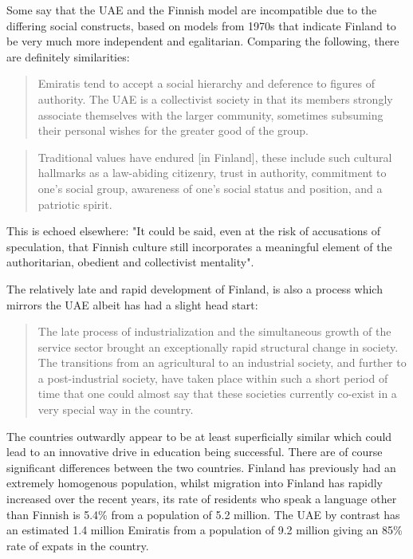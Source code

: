 Some \cite{Hatherley-Greene2016} say that the UAE and the Finnish model are incompatible due to the differing social constructs, based on models from 1970s that indicate Finland to be very much more independent and egalitarian. Comparing the following, there are definitely similarities:

\begin{quote}
Emiratis tend to accept a social hierarchy and deference to figures of authority. The UAE is a collectivist society in that its members strongly associate themselves with the larger community, sometimes subsuming their personal wishes for the greater good of the group.
\end{quote} \cite{Hatherley-Greene2016}

\begin{quote}
Traditional values have endured [in Finland], these include such cultural hallmarks as a law-abiding citizenry, trust in authority, commitment to one’s social group, awareness of one’s social status and position, and a patriotic spirit.
\end{quote} \cite{Sahlberg2007}

This is echoed elsewhere: "It could be said, even at the risk of accusations of speculation, that Finnish culture still incorporates a meaningful element of the authoritarian, obedient and collectivist mentality". \cite{Simola2005}

The relatively late and rapid development of Finland, is also a process which mirrors the UAE albeit has had a slight head start:

\begin{quote}
The late process of industrialization and the simultaneous growth of the service sector brought an exceptionally rapid structural change in society. The transitions from an agricultural to an industrial society, and further to a post-industrial society, have taken place within such a short period of time that one could almost say that these societies currently co-exist in a very special way in the country.
\end{quote} \cite{Simola2005}

The countries outwardly appear to be at least superficially similar which could lead to an innovative drive in education being successful. There are of course significant differences between the two countries. Finland has previously had an extremely homogenous population, whilst migration into Finland has rapidly increased over the recent years, its rate of residents who speak a language other than Finnish is 5.4\% from a population of 5.2 million. \cite{OfficialStatisticsofFinlandOSF2011} The UAE by contrast has an estimated 1.4 million Emiratis \cite{HABBOUSH2013}from a population of 9.2 million \cite{MalitJr.2013} giving an 85\% rate of expats in the country.


